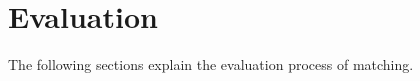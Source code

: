 \section{Evaluation}
\label{sec_evaluation}

The following sections explain the evaluation process of matching.


%